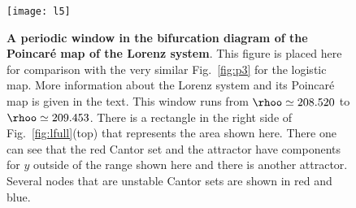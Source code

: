 \begin{figure}
 \centering
 \texttt{[image: l5]}
 \caption{{\bf A periodic window in the bifurcation diagram of the Poincar\'e map of the Lorenz system}.
 This figure is placed here for comparison with the very similar Fig.~\ref{fig:p3} for the logistic map. 
 More information about the Lorenz system and its Poincar\'e map is given in the text.
 This window runs from $\rhoo\simeq208.520$ to $\rhoo\simeq209.453$. 
 There is a rectangle in the right side of Fig.~\ref{fig:lfull}(top) that represents the area shown here. There one can see that the red Cantor set and the attractor have components for $y$ outside of the range shown here and there is another attractor. 
 Several nodes that are unstable Cantor sets are shown in red and blue. 
}
 \label{fig:lcr}
\end{figure} 